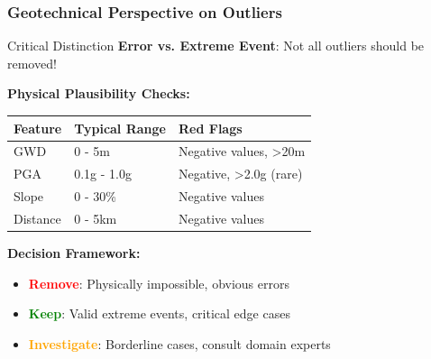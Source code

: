 \documentclass[aspectratio=169]{beamer}
\begin{document}
\begin{frame}
\frametitle{Geotechnical Perspective on Outliers}

\begin{block}{Critical Distinction}
\textbf{Error vs. Extreme Event}: Not all outliers should be removed!
\end{block}

\vspace{0.3cm}

\textbf{Physical Plausibility Checks:}

\begin{table}
\centering
\begin{tabular}{lll}
\toprule
\textbf{Feature} & \textbf{Typical Range} & \textbf{Red Flags} \\
\midrule
GWD & 0 - 5m & Negative values, >20m \\
PGA & 0.1g - 1.0g & Negative, >2.0g (rare) \\
Slope & 0 - 30\% & Negative values \\
Distance & 0 - 5km & Negative values \\
\bottomrule
\end{tabular}
\end{table}

\vspace{0.3cm}

\textbf{Decision Framework:}
\begin{itemize}
    \item \textcolor{red}{\textbf{Remove}}: Physically impossible, obvious errors
    \item \textcolor{green}{\textbf{Keep}}: Valid extreme events, critical edge cases
    \item \textcolor{orange}{\textbf{Investigate}}: Borderline cases, consult domain experts
\end{itemize}

\end{frame}
\end{document}
